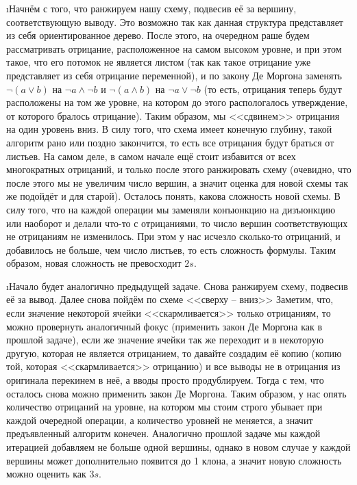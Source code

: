 \i Начнём с того, что ранжируем нашу схему, подвесив её за вершину, соответствующую выводу. Это возможно так как данная структура представляет из себя ориентированное дерево. После этого, на очередном раше будем рассматривать отрицание, расположенное на самом высоком уровне, и при этом такое, что его потомок не является листом (так как такое отрицание уже представляет из себя отрицание переменной), и по закону Де Моргона заменять $\neg(a \vee b)$ на $\neg a \wedge \neg b$ и $\neg(a \wedge b)$ на $\neg a \vee \neg b$ (то есть, отрицания теперь будут расположены на том же уровне, на котором до этого распологалось утверждение, от которого бралось отрицание). Таким образом, мы <<сдвинем>> отрицания на один уровень вниз. В силу того, что схема имеет конечную глубину, такой алгоритм рано или поздно закончится, то есть все отрицания будут браться от листьев. На самом деле, в самом начале ещё стоит избавится от всех многократных отрицаний, и только после этого ранжировать схему (очевидно, что после этого мы не увеличим число вершин, а значит оценка для новой схемы так же подойдёт и для старой). Осталось понять, какова сложность новой схемы. В силу того, что на каждой операции мы заменяли конъюнкцию на дизъюнкцию или наоборот и делали что-то с отрицаниями, то число вершин соответствующих не отрицаниям не изменилось. При этом у нас исчезло сколько-то отрицаний, и добавилось не больше, чем число листьев, то есть сложность формулы. Таким образом, новая сложность не превосходит $2s$.

\i Начало будет аналогично предыдущей задаче. Снова ранжируем схему, подвесив её за вывод. Далее снова пойдём по схеме <<сверху -- вниз>> Заметим, что, если значение некоторой ячейки <<скармливается>> только отрицаниям, то можно провернуть аналогичный фокус (применить закон Де Моргона как в прошлой задаче), если же значение ячейки так же переходит и в некоторую другую, которая не является отрицанием, то давайте создадим её копию (копию той, которая <<скармливается>> отрицанию) и все выводы не в отрицания из оригинала перекинем в неё, а вводы просто продублируем. Тогда с тем, что осталось снова можно применить закон Де Моргона. Таким образом, у нас опять количество отрицаний на уровне, на котором мы стоим строго убывает при каждой очередной операции, а количество уровней не меняется, а значит предъявленный алгоритм конечен. Аналогично прошлой задаче мы каждой итерацией добавляем не больше одной вершины, однако в новом случае у каждой вершины может дополнительно появится до 1 клона, а значит новую сложность можно оценить как $3s$.

